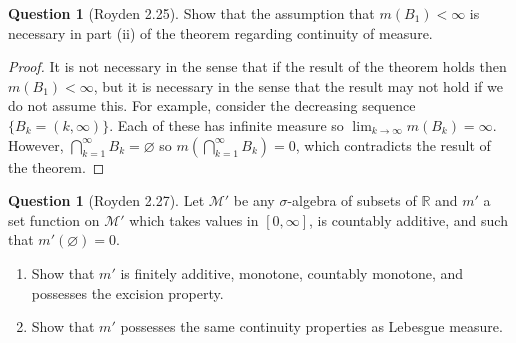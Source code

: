 \documentclass{article}
\newcommand{\R}{\mathbb{R}}
\theoremstyle{definition} %
\numberwithin{thm}{section} %
\theoremstyle{definition} %
\newtheorem{question}[thm]{Question}
\begin{document}
\begin{question}[Royden 2.25]
Show that the assumption that $m(B_1) < \infty$ is necessary in part (ii) of the theorem regarding continuity of measure.
\end{question}
\begin{proof}
It is not necessary in the sense that if the result of the theorem holds then $m(B_1) < \infty$, but it is necessary in the sense that the result may not hold if we do not assume this. For example, consider the decreasing sequence $\{B_k = (k, \infty)\}$. Each of these has infinite measure so $\lim_{k \to \infty} m(B_k) = \infty$. However, $\bigcap_{k = 1}^\infty B_k = \varnothing$ so $m(\bigcap_{k = 1}^\infty B_k) = 0$, which contradicts the result of the theorem.
\end{proof}

\begin{question}[Royden 2.27]
Let $\mathcal{M}'$ be any $\sigma$-algebra of subsets of $\R$ and $m'$ a set function on $\mathcal{M}'$ which takes values in $[0, \infty]$, is countably additive, and such that $m'(\varnothing) = 0$.
\begin{enumerate}[label = (\roman*)]
    \item Show that $m'$ is finitely additive, monotone, countably monotone, and possesses the excision property.
    \item Show that $m'$ possesses the same continuity properties as Lebesgue measure.
\end{enumerate}
\end{question}
\end{document}
